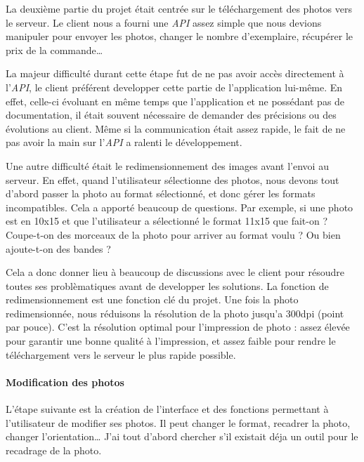 \documentclass[12pt,a4paper]{article}
\begin{document}
  \bigskip

  La deuxième partie du projet était centrée sur le téléchargement des
  photos vers le serveur. Le client nous a fourni une \emph{API} assez
  simple que nous devions manipuler pour envoyer les photos, changer le
  nombre d'exemplaire, récupérer le prix de la commande\ldots{}

  \bigskip

  La majeur difficulté durant cette étape fut de ne pas avoir accès
  directement à l'\emph{API}, le client préférent developper cette partie
  de l'application lui-même. En effet, celle-ci évoluant en même temps que
  l'application et ne possédant pas de documentation, il était souvent
  nécessaire de demander des précisions ou des évolutions au client. Même
  si la communication était assez rapide, le fait de ne pas avoir la main
  sur l'\emph{API} a ralenti le développement.

  \bigskip

  Une autre difficulté était le redimensionnement des images avant l'envoi
  au serveur. En effet, quand l'utilisateur sélectionne des photos, nous
  devons tout d'abord passer la photo au format sélectionné, et donc gérer
  les formats incompatibles. Cela a apporté beaucoup de questions. Par
  exemple, si une photo est en 10x15 et que l'utilisateur a sélectionné le
  format 11x15 que fait-on ? Coupe-t-on des morceaux de la photo pour
  arriver au format voulu ? Ou bien ajoute-t-on des bandes ?

  \bigskip

  Cela a donc donner lieu à beaucoup de discussions avec le client pour
  résoudre toutes ses problèmatiques avant de developper les solutions. La
  fonction de redimensionnement est une fonction clé du projet. Une fois
  la photo redimensionnée, nous réduisons la résolution de la photo
  jusqu'a 300dpi (point par pouce). C'est la résolution optimal pour
  l'impression de photo : assez élevée pour garantir une bonne qualité à
  l'impression, et assez faible pour rendre le téléchargement vers le
  serveur le plus rapide possible.

  \bigskip

  \paragraph{Modification des photos}\label{modification-des-photos}

  \bigskip

  L'étape suivante est la création de l'interface et des fonctions
  permettant à l'utilisateur de modifier ses photos. Il peut changer le
  format, recadrer la photo, changer l'orientation\ldots{} J'ai tout
  d'abord chercher s'il existait déja un outil pour le recadrage de la
  photo.
\end{document}
